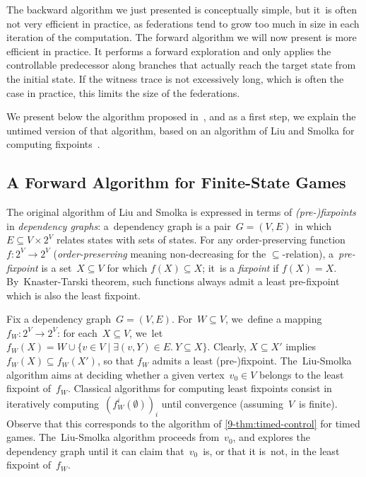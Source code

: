 The backward algorithm we just presented is conceptually simple, but
it~is often not very efficient in practice,
as federations tend to grow too much in size in each iteration of the
computation.
The forward algorithm we will now present is more efficient in practice.
It performs a forward exploration and only applies the controllable predecessor along branches
that actually reach the target state from the initial state. If the witness
trace is not excessively long, which is often the case in practice,
this limits the size of the federations.


We present below the algorithm proposed in~\cite{CDFLL05},
and as a first step, we explain the untimed version of that algorithm,
based on an algorithm of Liu and Smolka for computing
fixpoints~\cite{LS98}.


\subsection*{A Forward Algorithm for Finite-State Games}

The original algorithm of Liu and Smolka is expressed in terms of
\emph{(pre-)fixpoints} in \emph{dependency graphs}: a~dependency graph
is a pair~$G=(V,E)$ in which $E \subseteq V \times 2^V$ relates
states with sets of states.
%
For any order-preserving 
function~$f\colon 2^V\to2^V$
(\emph{order-preserving} meaning non-decreasing for the $\subseteq$-relation),
a~\emph{pre-fixpoint} is a set~$X\subseteq V$ for which $f(X)\subseteq
X$; it~is a \emph{fixpoint} if $f(X)=X$. By~Knaster-Tarski theorem, such
functions always admit a least pre-fixpoint which is also the least fixpoint.
%

Fix a dependency graph~$G=(V,E)$. 
For~$W\subseteq V$,
we~define a mapping $f_W\colon 2^V\to 2^V$: for
each~$X\subseteq V$, we~let $f_W(X)=W\cup \{v\in V\mid \exists (v,Y)\in
E.\ Y\subseteq X\}$.
%
Clearly, $X\subseteq X'$ implies $f_W(X)\subseteq f_W(X')$, so that $f_W$ admits
a least (pre-)fixpoint.
The~Liu-Smolka
algorithm aims at deciding whether a given vertex~$v_0\in V$ belongs
to the least fixpoint of~$f_W$.  Classical algorithms for computing
least fixpoints consist in iteratively
computing~$(f_W^i(\emptyset))_i$ until convergence (assuming~$V$~is
finite). Observe that this corresponds to the algorithm of \cref{9-thm:timed-control}
for timed games.
The~Liu-Smolka algorithm proceeds from~$v_0$, and explores
the dependency graph until it can claim that~$v_0$~is, or that it
is~not, in the least fixpoint of~$f_W$.



